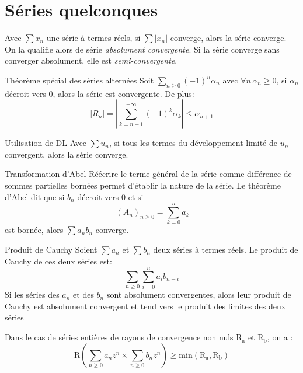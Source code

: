 \documentclass[french, a4paper, 11pt, twocolumn]{article}
\newcommand{\po}{\left(}         %
\newcommand{\pf}{\right)}        %
\newcommand{\pof}[1]{\po #1 \pf} %
\begin{document}
\section{Séries quelconques}
\begin{definition}
  Avec \(\sum x_{n}\) une série à termes  réels, si \(\sum\left| x_{n}\right|\) converge, alors la série converge. On la qualifie alors de série \emph{absolument convergente}. Si la série converge sans converger absolument, elle est \emph{semi-convergente}.
\end{definition}

\begin{theoreme}{Théorème spécial des séries alternées}
  Soit \(\sum_{n\geqslant 0} (-1)^n \alpha_{n}\) avec \(\forall n\, \alpha_{n}\geqslant 0\),
  si \(\alpha_{n}\) décroit vers \(0\), alors la série est convergente.
  De plus: \[\left\lvert R_n \right\rvert =\left\lvert\sum_{k=n+1}^{+\infty}(-1)^k \alpha_{k}\right\rvert \leq \alpha_{n+1}\]
\end{theoreme}

\begin{theoreme}{Utilisation de DL}
  Avec \(\sum u_{n}\), si tous les termes du développement limité de \(u_{n}\) convergent, alors la série converge.
\end{theoreme}

\begin{theoreme}{Transformation d'Abel}
  Réécrire le terme général de la série comme différence de sommes partielles bornées permet d'établir la nature de la série.
  \tcblower
  Le théorème d'Abel dit que si \(b_{n}\) décroit vers \(0\) et si \[\ \pof{A_{n}}_{n\geqslant 0}=\sum_{k=0}^n a_k\] est bornée, alors \(\sum a_{n}b_{n}\) converge.
\end{theoreme}

\begin{theoreme}{Produit de Cauchy}
  Soient \(\sum a_{n}\) et \(\sum b_{n}\) deux séries à termes réels. Le produit de Cauchy de ces deux séries est:
  \[\sum_{n\geqslant 0}\sum_{i=0}^{n}a_{i}b_{n-i}\]
  Si les séries des \(a_{n}\) et des \(b_{n}\) sont absolument convergentes, alors leur produit de Cauchy est absolument convergent et tend vers le produit des limites des deux séries

  \tcblower
  Dans le cas de séries entières de rayons de convergence non nuls \(\mathrm{R_a}\) et \(\mathrm{R_b}\), on a :
    \[\mathrm{R}\left(\sum_{n\geq 0} a_{n}z^n \times \sum_{n\geq 0} b_{n}z^n\right) \geq \mathrm{min}\left(\mathrm{R_a,R_b}\right)\]
\end{theoreme}
\end{document}
